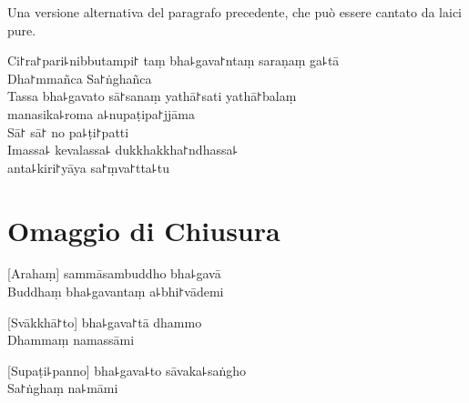 \clearpage

\begin{instruction}
  Una versione alternativa del paragrafo precedente, che può essere cantato da laici pure.
\end{instruction}

Ci꜓ra꜓pari꜕nibbutampi꜓ taṃ bha꜕gava꜓ntaṃ saraṇaṃ ga꜕tā\\
Dha꜓mmañca Sa꜓ṅghañca\\
Tassa bha꜕gavato sā꜓sanaṃ yathā꜓sati yathā꜓balaṃ\\
\vin manasika꜕roma a꜕nupaṭipa꜓jjāma\\
Sā꜓ sā꜓ no pa꜕ṭi꜓patti\\
Imassa꜕ kevalassa꜕ dukkhakkha꜓ndhassa꜕\\
\vin anta꜕kiri꜓yāya sa꜓ṃva꜓tta꜕tu

\chapter{Omaggio di Chiusura}       %

[Arahaṃ] sammāsambuddho bha꜕gavā\\
Buddhaṃ bha꜕gavantaṃ a꜕bhi꜓vādemi 

[Svākkhā꜓to] bha꜕gava꜓tā dhammo\\
Dhammaṃ namassāmi 

[Supaṭi꜕panno] bha꜕gava꜕to sāvaka꜕saṅgho\\
Sa꜓ṅghaṃ na꜕māmi 



